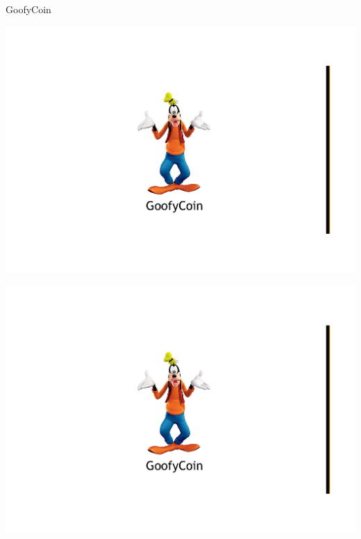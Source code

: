 \begin{frame}{GoofyCoin}

\begin{overprint}
\begin{center}
\includegraphics[width=\textwidth,page=1]{goofy-coin}
\end{center}
\begin{center}
\includegraphics[width=\textwidth,page=2]{goofy-coin}
\end{center}
\begin{center}

\end{center}
\end{overprint}
\end{frame}
